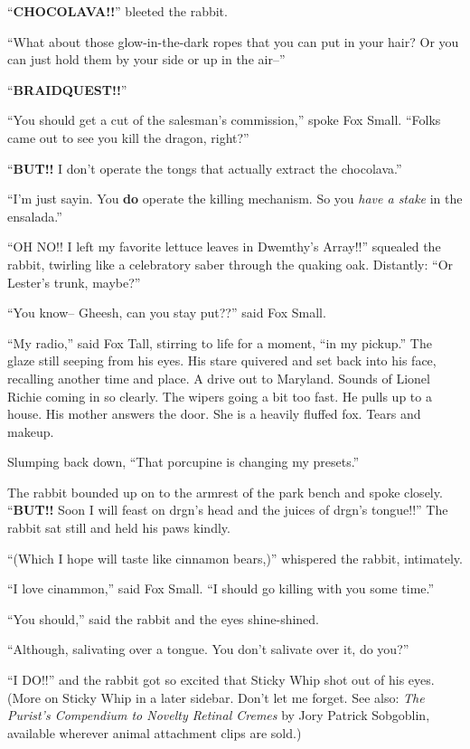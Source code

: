 \documentclass[12pt,twoside]{report}
\begin{document}
``{\bf CHOCOLAVA!!}'' bleeted the rabbit.

``What about those glow-in-the-dark ropes that you can put in your
        hair?  Or you can just hold them by your side or up in the
        air--''

``{\bf BRAIDQUEST!!}''

``You should get a cut of the salesman's commission,'' spoke Fox
        Small.  ``Folks came out to see you kill the dragon, right?''

``{\bf BUT!!}  I don't operate the tongs that actually extract the
        chocolava.''

\pagebreak

``I'm just sayin.  You {\bf do} operate the killing mechanism.  So you
        {\em have a stake} in the ensalada.''

``OH NO!!  I left my favorite lettuce leaves in Dwemthy's Array!!''
        squealed the rabbit, twirling like a celebratory saber through
        the quaking oak.  Distantly: ``Or Lester's trunk, maybe?''

``You know-- Gheesh, can you stay put??'' said Fox Small.

``My radio,'' said Fox Tall, stirring to life for a moment, ``in my
        pickup.''  The glaze still seeping from his eyes.  His stare
        quivered and set back into his face, recalling another time
        and place.  A drive out to Maryland.  Sounds of Lionel Richie
        coming in so clearly.  The wipers going a bit too fast.  He
        pulls up to a house.  His mother answers the door. She is a
        heavily fluffed fox.  Tears and makeup.

Slumping back down, ``That porcupine is changing my presets.''

The rabbit bounded up on to the armrest of the park bench and spoke
closely.  ``{\bf BUT!!} Soon I will feast on drgn's head and the
juices of drgn's tongue!!''  The rabbit sat still and held his paws
kindly.

``(Which I hope will taste like cinnamon bears,)'' whispered the
rabbit, intimately.

``I love cinammon,'' said Fox Small.  ``I should go killing with you
some time.''

``You should,'' said the rabbit and the eyes shine-shined.

``Although, salivating over a tongue.  You don't salivate over it, do
you?''

``I DO!!'' and the rabbit got so excited that Sticky Whip shot out of
his eyes.  (More on Sticky Whip in a later sidebar. Don't let me
forget.  See also: {\em The Purist's Compendium to Novelty Retinal
  Cremes} by Jory Patrick Sobgoblin, available wherever animal
attachment clips are sold.)
\end{document}
